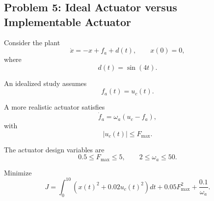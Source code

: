 \subsection*{Problem 5: Ideal Actuator versus Implementable Actuator}

Consider the plant
\begin{equation}
\dot{x}=-x+f_a+d(t),
\qquad
x(0)=0,
\end{equation}
where
\begin{equation}
d(t)=\sin(4t).
\end{equation}

An idealized study assumes
\begin{equation}
f_a(t)=u_c(t).
\end{equation}

A more realistic actuator satisfies
\begin{equation}
\dot{f}_a
=
\omega_a
\left(
u_c-f_a
\right),
\end{equation}
with
\begin{equation}
|u_c(t)|\leq F_{\max}.
\end{equation}

The actuator design variables are
\begin{equation}
0.5\leq F_{\max}\leq5,
\qquad
2\leq\omega_a\leq50.
\end{equation}

Minimize
\begin{equation}
J
=
\int_0^{10}
\left(
x(t)^2
+
0.02u_c(t)^2
\right)dt
+
0.05F_{\max}^2
+
\frac{0.1}{\omega_a}.
\end{equation}

